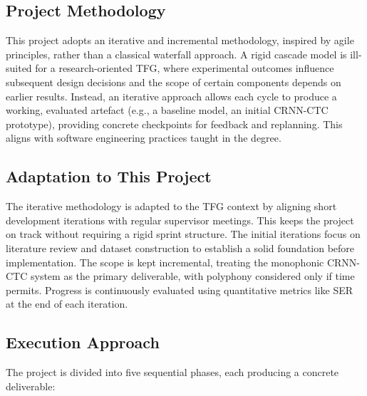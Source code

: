 \documentclass[11pt, a4paper]{article}
\begin{document}
\subsection{Project Methodology}
This project adopts an iterative and incremental methodology, inspired by agile principles, rather than a classical waterfall approach. A rigid cascade model is ill-suited for a research-oriented TFG, where experimental outcomes influence subsequent design decisions and the scope of certain components depends on earlier results. Instead, an iterative approach allows each cycle to produce a working, evaluated artefact (e.g., a baseline model, an initial CRNN-CTC prototype), providing concrete checkpoints for feedback and replanning. This aligns with software engineering practices taught in the degree.

\subsection{Adaptation to This Project}
The iterative methodology is adapted to the TFG context by aligning short development iterations with regular supervisor meetings. This keeps the project on track without requiring a rigid sprint structure. The initial iterations focus on literature review and dataset construction to establish a solid foundation before implementation. The scope is kept incremental, treating the monophonic CRNN-CTC system as the primary deliverable, with polyphony considered only if time permits. Progress is continuously evaluated using quantitative metrics like SER at the end of each iteration.

\subsection{Execution Approach}
The project is divided into five sequential phases, each producing a concrete deliverable:
\end{document}
